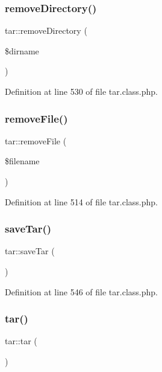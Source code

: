 \subsubsection{\texorpdfstring{remove\+Directory()}{removeDirectory()}}
{\footnotesize\ttfamily tar\+::remove\+Directory (\begin{DoxyParamCaption}\item[{}]{\$dirname }\end{DoxyParamCaption})}



Definition at line 530 of file tar.\+class.\+php.

\hypertarget{classtar_a51cd4b11f9e4e6c9c5c0bc93d5a063c7}{}\label{classtar_a51cd4b11f9e4e6c9c5c0bc93d5a063c7} 
\subsubsection{\texorpdfstring{remove\+File()}{removeFile()}}
{\footnotesize\ttfamily tar\+::remove\+File (\begin{DoxyParamCaption}\item[{}]{\$filename }\end{DoxyParamCaption})}



Definition at line 514 of file tar.\+class.\+php.

\hypertarget{classtar_ac70edc9fc85a3106aaa3c07a3a57a0a2}{}\label{classtar_ac70edc9fc85a3106aaa3c07a3a57a0a2} 
\subsubsection{\texorpdfstring{save\+Tar()}{saveTar()}}
{\footnotesize\ttfamily tar\+::save\+Tar (\begin{DoxyParamCaption}{ }\end{DoxyParamCaption})}



Definition at line 546 of file tar.\+class.\+php.

\hypertarget{classtar_a310c3cc3417ea0fdb5c1c96cc5b47efa}{}\label{classtar_a310c3cc3417ea0fdb5c1c96cc5b47efa} 
\subsubsection{\texorpdfstring{tar()}{tar()}}
{\footnotesize\ttfamily tar\+::tar (\begin{DoxyParamCaption}{ }\end{DoxyParamCaption})}



